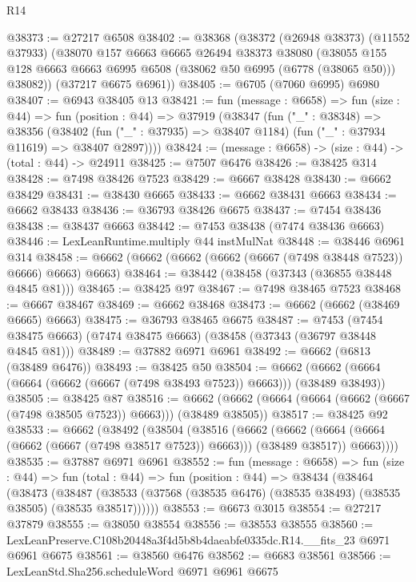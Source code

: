 \begin{lexlean}{R14}
\begin{coremodule}
@38373 := @27217 @6508
@38402 := @38368
    (@38372
      (@26948 @38373)
      (@11552 @37933)
      (@38070
        @157
        @6663
        @6665
        @26494
        @38373
        @38080
        (@38055 @155 @128 @6663 @6663 @6995 @6508 (@38062 @50 @6995 (@6778 (@38065 @50))) @38082))
      (@37217 @6675 @6961))
@38405 := @6705 (@7060 @6995) @6980
@38407 := @6943 @38405 @13
@38421 := fun (message : @6658) =>
  fun (size : @44) =>
  fun (position : @44) =>
  @37919
    (@38347
      (fun ("_" : @38348) =>
      @38356
        (@38402 (fun ("_" : @37935) => @38407 @1184) (fun ("_" : @37934 @11619) => @38407 @2897))))
@38424 := (message : @6658) -> (size : @44) -> (total : @44) -> @24911
@38425 := @7507 @6476
@38426 := @38425 @314
@38428 := @7498 @38426 @7523
@38429 := @6667 @38428
@38430 := @6662 @38429
@38431 := @38430 @6665
@38433 := @6662 @38431 @6663
@38434 := @6662 @38433
@38436 := @36793 @38426 @6675
@38437 := @7454 @38436
@38438 := @38437 @6663
@38442 := @7453 @38438 (@7474 @38436 @6663)
@38446 := LexLeanRuntime.multiply @44 instMulNat
@38448 := @38446 @6961 @314
@38458 := @6662 (@6662 (@6662 (@6662 (@6667 (@7498 @38448 @7523)) @6666) @6663) @6663)
@38464 := @38442 (@38458 (@37343 (@36855 @38448 @4845 @81)))
@38465 := @38425 @97
@38467 := @7498 @38465 @7523
@38468 := @6667 @38467
@38469 := @6662 @38468
@38473 := @6662 (@6662 (@38469 @6665) @6663)
@38475 := @36793 @38465 @6675
@38487 := @7453
    (@7454 @38475 @6663)
    (@7474 @38475 @6663)
    (@38458 (@37343 (@36797 @38448 @4845 @81)))
@38489 := @37882 @6971 @6961
@38492 := @6662 (@6813 (@38489 @6476))
@38493 := @38425 @50
@38504 := @6662 (@6662 (@6664 (@6664 (@6662 (@6667 (@7498 @38493 @7523)) @6663))) (@38489 @38493))
@38505 := @38425 @87
@38516 := @6662 (@6662 (@6664 (@6664 (@6662 (@6667 (@7498 @38505 @7523)) @6663))) (@38489 @38505))
@38517 := @38425 @92
@38533 := @6662
    (@38492
      (@38504
        (@38516
          (@6662
            (@6662 (@6664 (@6664 (@6662 (@6667 (@7498 @38517 @7523)) @6663))) (@38489 @38517))
            @6663))))
@38535 := @37887 @6971 @6961
@38552 := fun (message : @6658) =>
  fun (size : @44) =>
  fun (total : @44) =>
  fun (position : @44) =>
  @38434
    (@38464
      (@38473
        (@38487 (@38533 (@37568 (@38535 @6476) (@38535 @38493) (@38535 @38505) (@38535 @38517))))))
@38553 := @6673 @3015
@38554 := @27217 @37879
@38555 := @38050 @38554
@38556 := @38553 @38555
@38560 := LexLeanPreserve.C108b20448a3f4d5b8b4daeabfe0335dc.R14.__fits_23 @6971 @6961 @6675
@38561 := @38560 @6476
@38562 := @6683 @38561
@38566 := LexLeanStd.Sha256.scheduleWord @6971 @6961 @6675

\end{coremodule}
\end{lexlean}
